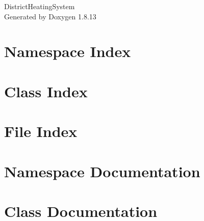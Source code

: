 \documentclass[twoside]{book}
\newcommand{\+}{\discretionary{\mbox{\scriptsize$\hookleftarrow$}}{}{}}
\newcommand{\clearemptydoublepage}{%
  \newpage{\pagestyle{empty}\cleardoublepage}%
}
\begin{document}
\hypersetup{pageanchor=false,
             bookmarksnumbered=true,
             pdfencoding=unicode
            }
\begin{titlepage}
\vspace*{7cm}
\begin{center}%
{\Large District\+Heating\+System }\\
\vspace*{1cm}
{\large Generated by Doxygen 1.8.13}\\
\end{center}
\end{titlepage}
\clearemptydoublepage
{}
\tableofcontents
\clearemptydoublepage
{}
\hypersetup{pageanchor=true}

\chapter{Namespace Index}

\chapter{Class Index}

\chapter{File Index}

\chapter{Namespace Documentation}





















\chapter{Class Documentation}













\end{document}
